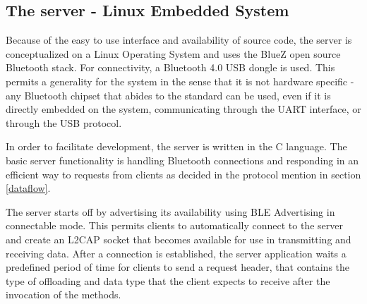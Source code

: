 \documentclass[twoside]{article}
\begin{document}
\begin{multicols}{2}

\subsection{The server - Linux Embedded System}

Because of the easy to use interface and availability of source code, the server is conceptualized on a Linux Operating System and uses the BlueZ\cite{BlueZ} open source Bluetooth stack. For connectivity, a Bluetooth 4.0 USB dongle is used. This permits a generality for the  system in the sense that it is not hardware specific - any Bluetooth chipset that abides to the standard can be used, even if it is directly embedded on the system, communicating through the UART interface, or through the USB protocol.

In order to facilitate development, the server is written in the C language. The basic server functionality is handling Bluetooth connections and responding in an efficient way to requests from clients as decided in the protocol mention in section \ref{dataflow}.

The server starts off by advertising its availability using BLE Advertising\cite{BLE2} in connectable mode. This permits clients to automatically connect to the server and create an L2CAP socket that becomes available for use in transmitting and receiving data. After a connection is established, the server application waits a predefined period of time for clients to send a request header, that contains the type of offloading and data type that the client expects to receive after the invocation of the methods.




\end{multicols}
\end{document}
